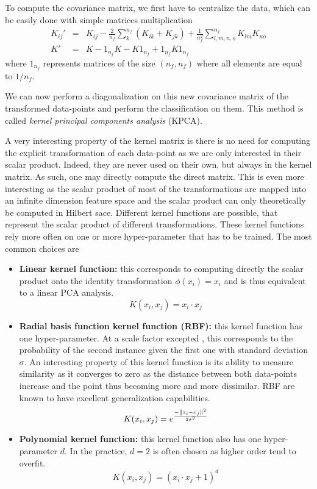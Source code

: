 To compute the covariance matrix, we first have to centralize the data, which can be easily done with simple matrices multiplication
\begin{eqnarray}
    K_{ij}'&=& K_{ij} - \frac{2}{n_f} \sum_k^{n_f}\left( K_{ik}+K_{jk} \right) + \frac{1}{n_f^2} \sum_{l,m,n,o}^{n_f}K_{lm}K_{no} \\
    K' &=& K - 1_{n_f}K - K1_{n_f}+ 1_{n_f}K1_{n_f}
\end{eqnarray}
where $1_{n_f}$ represents matrices of the size $\left( n_f , n_f \right)$ where all elements are equal to $1/n_f$.

We can now perform a diagonalization on this new covariance matrix of the transformed data-points and perform the classification on them. This method is called \emph{kernel principal components analysis} (KPCA). 

A very interesting property of the kernel matrix is there is no need for computing the explicit transformation of each data-point as we are only interested in their scalar product. Indeed, they are never used on their own, but always in the kernel matrix. As such, one may directly compute the direct matrix. This is even more interesting as the scalar product of most of the transformations are mapped into an infinite dimension feature space and the scalar product can only theoretically be computed in Hilbert sace. Different kernel functions are possible, that represent the scalar product of different transformations. These kernel functions rely more often on one or more hyper-parameter that has to be trained. The most common choices are
\begin{itemize}
    \item \textbf{Linear kernel function:} this corresponds to computing directly the scalar product onto the identity transformation $\phi(x_i)=x_i$ and is thus equivalent to a linear PCA analysis.
    \begin{equation}
        K(x_i,x_j) = x_i \cdot x_j
    \end{equation}
    \item \textbf{Radial basis function kernel function (RBF):} this kernel function has one hyper-parameter. At a scale factor excepted , this corresponds to the probability of the second instance given the first one with standard deviation $\sigma$. An interesting property of this kernel function is its ability to measure similarity as it converges to zero as the distance between both data-points increase and the point thus becoming more and more dissimilar. RBF are known to have excellent generalization capabilities.
    \begin{equation}
        K(x_i,x_j) = e^{\frac{-\left\lVert x_i-x_j\right\rVert^2}{2\sigma^2}}
    \end{equation}
    \item \textbf{Polynomial kernel function:} this kernel function also has one hyper-parameter $d$. In the practice, $d=2$ is often chosen as higher order tend to overfit.
    \begin{equation}
        K(x_i,x_j) = (x_i \cdot x_j +1)^d
    \end{equation}
\end{itemize}

